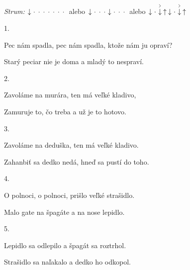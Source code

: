 \begin{song}


\begin{headerbox}
\RaiseBoxWithAccents
\textit{Strum:} $\Down\Miss\Miss\Miss\Miss\Miss\Miss\Miss$
alebo $\Down\Miss\Miss\Miss\Down\Miss\Miss\Miss$
alebo $\Down\Miss\AccentDown\Up\Down\Miss\AccentDown\Up$
\end{headerbox}

\begin{hchordbox}
 \quad
{}
\end{hchordbox}

\Large

\bigskip

1. \par
{}Pec nám spadla, pec nám spadla, ktože nám ju opraví? \par
{}Starý peciar nie je doma a mladý to nespraví. \par

\bigskip

2. \par
{}Zavoláme na murára, ten má veľké kladivo, \par
{}Zamuruje to, čo treba a už je to hotovo. \par

\bigskip

3. \par
{}Zavoláme na deduška, ten má veľké kladivo. \par
{}Zahanbiť sa dedko nedá, hneď sa pustí do toho. \par

\bigskip

4. \par
{}O polnoci, o polnoci, prišlo veľké strašidlo. \par
{}Malo gate na špagáte a na nose lepidlo. \par

\bigskip

5. \par
{}Lepidlo sa odlepilo a špagát sa roztrhol. \par
{}Strašidlo sa naľakalo a dedko ho odkopol. \par

\end{song}
